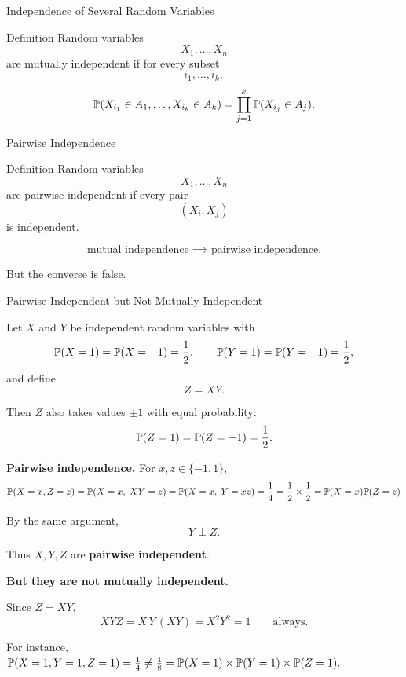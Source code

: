 \begin{frame}{Independence of Several Random Variables}
\begin{keybox}{Definition}
Random variables
\[
X_1,\dots,X_n
\]
are mutually independent if for every subset
\[
i_1,\dots,i_k,
\]
\[
\mathbb{P}(X_{i_1}\in A_1,\dots,X_{i_k}\in A_k)
=
\prod_{j=1}^k
\mathbb{P}(X_{i_j}\in A_j).
\]
\end{keybox}
\end{frame}

\begin{frame}{Pairwise Independence}
\begin{keybox}{Definition}
Random variables
\[
X_1,\dots,X_n
\]
are pairwise independent if every pair
\[
(X_i,X_j)
\]
is independent.
\end{keybox}

\vspace{0.25cm}

\[
\text{mutual independence}
\implies
\text{pairwise independence}.
\]

But the converse is false.
\end{frame}



















\begin{frame}{Pairwise Independent but Not Mutually Independent}

Let $X$ and $Y$ be independent random variables with
$$
\mathbb{P}(X=1)=\mathbb{P}(X=-1)=\frac12,
\qquad
\mathbb{P}(Y=1)=\mathbb{P}(Y=-1)=\frac12,
$$
and define
$$
Z=XY.
$$

Then $Z$ also takes values $\pm1$ with equal probability:
$$
\mathbb{P}(Z=1)=\mathbb{P}(Z=-1)=\frac12.
$$

\textbf{Pairwise independence.}
For $x,z\in\{-1,1\}$,
$$
\mathbb{P}(X=x,Z=z)
=
\mathbb{P}(X=x,\;XY=z)
=
\mathbb{P}(X=x,\;Y=xz)
=
\frac14 = \frac{1}{2}\times \frac{1}{2} = \mathbb{P}(X=x)\mathbb{P}(Z=z)
$$
 

By the same argument,
$$
Y\perp Z.
$$

Thus $X,Y,Z$ are \textbf{pairwise independent}.



\textbf{But they are not mutually independent.}

Since $Z=XY$,
$$
XYZ=X\,Y\,(XY)=X^2Y^2=1
\qquad\text{always}.
$$

For instance,
$
\mathbb{P}(X=1,Y=1,Z=1)=\frac14 \neq \frac18=\mathbb{P}(X=1)\times \mathbb{P}(Y=1) \times \mathbb{P}(Z=1).
$
\end{frame}






